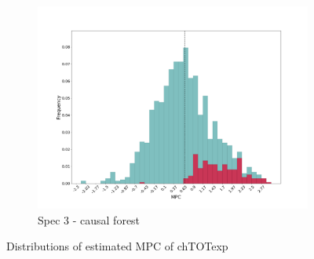 \begin{figure}[t]
\begin{subfigure}{0.33\linewidth}
        \includegraphics[width=\linewidth]{figures/distributions/spec3_cf_chTOTexp.png}
        \caption{Spec 3 - causal forest}
    \end{subfigure}\hfill
    \caption{Distributions of estimated MPC of chTOTexp}
\end{figure}
